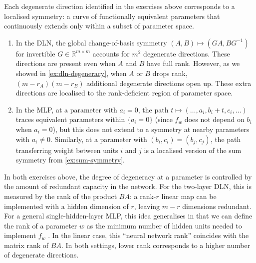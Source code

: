 \documentclass[11pt]{article}
\newcommand{\R}{\mathbb{R}}
\begin{document}
\begin{remark}
    Each degenerate direction identified in the exercises above corresponds to
    a localised symmetry: a curve of functionally equivalent parameters that
    continuously extends only within a subset of parameter space.
    \begin{enumerate}
        \item
            In the DLN, the global change-of-basis symmetry
            $(A, B) \mapsto (G A, B G^{-1})$
            for invertible $G \in \R^{m\times m}$ accounts for $m^2$ degenerate
            directions.
            These directions are present even when $A$ and $B$ have full
            rank. However, as we showed in \cref{ex:dln-degeneracy}, when
            $A$ or $B$ drops rank, $(m - r_A)(m - r_B)$ additional degenerate
            directions open up.
            These extra directions are localised to the rank-deficient region
            of parameter space.
        \item
            In the MLP, at a parameter with $a_i = 0$, the path
            $t \mapsto (\ldots, a_i, b_i + t, c_i, \ldots)$
            traces equivalent parameters within $\{a_i = 0\}$ (since $f_w$
            does not depend on $b_i$ when $a_i = 0$), but this does not
            extend to a symmetry at nearby parameters with $a_i \neq 0$.
            Similarly, at a parameter with $(b_i, c_i) = (b_j, c_j)$, the
            path transferring weight between units $i$ and $j$ is a localised
            version of the sum symmetry from \cref{ex:sum-symmetry}.
    \end{enumerate}
\end{remark}

\begin{remark}
\label{rem:rank}
    In both exercises above, the degree of degeneracy at a parameter is
    controlled by the amount of redundant capacity in the network.
    For the two-layer DLN, this is measured by the rank of the product $BA$:
    a rank-$r$ linear map can be implemented with a hidden dimension of $r$,
    leaving $m - r$ dimensions redundant.
    For a general single-hidden-layer MLP, this idea generalises in that
    we can define the rank of a parameter $w$ as the minimum number of
    hidden units needed to implement $f_w$
        \citep{FarrugiaRoberts2022,FarrugiaRoberts2024}.
    In the linear case, this ``neural network rank'' coincides with the
    matrix rank of $BA$.
    In both settings, lower rank corresponds to a higher number of
    degenerate directions.
\end{remark}
\end{document}
